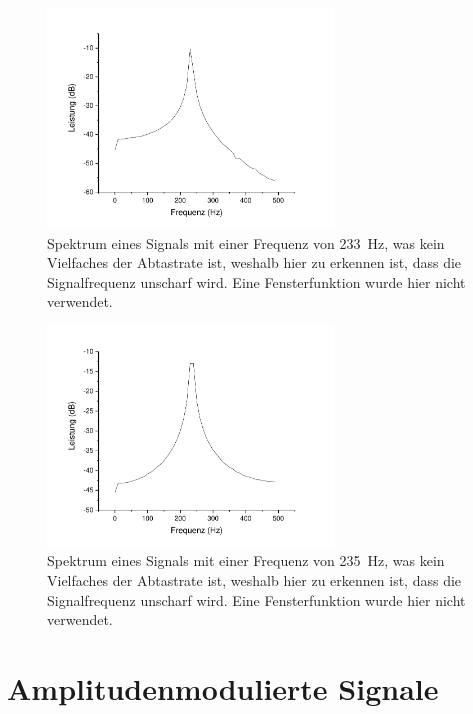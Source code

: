 \documentclass[
a4paper,
12pt,
pagesize,
ngerman
]{scrartcl}
\begin{document}
	\begin{figure}[H]  
		\includegraphics[width=0.68\textwidth]{Origin-Files/unpassend_233nonhann}
		\centering
		\caption{
			Spektrum eines Signals mit einer Frequenz von \SI{233}{\hertz}, was kein Vielfaches der Abtastrate ist, weshalb hier zu erkennen ist, dass die Signalfrequenz unscharf wird. Eine Fensterfunktion wurde hier nicht verwendet.
		}
		\label{fig_tag3_unpassend_233hz}
		\centering
	\end{figure}
	
	\begin{figure}[H]  
		\includegraphics[width=0.68\textwidth]{Origin-Files/unpassend_235nonhann}
		\centering
		\caption{
			Spektrum eines Signals mit einer Frequenz von \SI{235}{\hertz}, was kein Vielfaches der Abtastrate ist, weshalb hier zu erkennen ist, dass die Signalfrequenz unscharf wird. Eine Fensterfunktion wurde hier nicht verwendet.
		}
		\label{fig_tag3_unpassend_235hz}
		\centering
	\end{figure}
	
	\newpage
	
	
	\section{Amplitudenmodulierte Signale}
\end{document}
